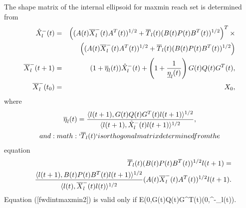\documentclass[letterpaper,10pt,english]{sphinxmanual}
\begin{document}
The shape matrix of the internal ellipsoid for maxmin reach set is
determined from
\begin{gather}
\begin{split}\begin{aligned}
\hat{X}^-_l(t) & = &
\left((A(t)\overline{X}^-_l(t)A^T(t))^{1/2} +
\overline{T}_l(t)(B(t)P(t)B^T(t))^{1/2}\right)^T
\times \nonumber \\
& &\left((A(t)\overline{X}^-_l(t)A^T(t))^{1/2} +
\overline{T}_l(t)(B(t)P(t)B^T(t))^{1/2}\right)
\label{fwdintmaxmin1}\\
\overline{X}^-_l(t+1) & = &
(1+\overline{\eta}_l(t))\hat{X}^-_l(t) +
\left(1+\frac{1}{\underline{\eta}_l(t)}\right)
G(t)Q(t)G^T(t), \label{fwdintmaxmin2} \\
\overline{X}^-_l(t_0) & = & X_0, \label{fwdintmaxmin3}\end{aligned}\end{split}\notag
\end{gather}
where
\begin{gather}
\begin{split}  \overline{\eta}_l(t) = \frac{\langle l(t+1),
  G(t)Q(t)G^T(t)l(t+1)\rangle^{1/2}}{\langle l(t+1),
  \hat{X}^-_l(t)l(t+1)\rangle^{1/2}},\end{split}\notag\\\begin{split}and :math:`\overline{T}_l(t)` is orthogonal matrix determined from the\end{split}\notag
\end{gather}
equation
\begin{gather}
\begin{split}\begin{aligned}
& & \overline{T}_l(t)(B(t)P(t)B^T(t))^{1/2}l(t+1) = \\
& & \frac{\langle l(t+1),
B(t)P(t)B^T(t)l(t+1)\rangle^{1/2}}{\langle l(t),
\overline{X}^-_l(t)l(t)\rangle^{1/2}}(A(t)\overline{X}^-_l(t)A^T(t))^{1/2}l(t+1).\end{aligned}\end{split}\notag
\end{gather}
Equation ({[}fwdintmaxmin2{]}) is valid only if
{\mathcal E}(0,G(t)Q(t)G^T(t)(0,^-_l(t)).
\end{document}
